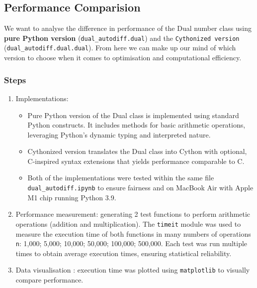 \documentclass[12.5pt]{article}
\begin{document}
\subsection{Performance Comparision}
We want to analyse the difference in performance of the Dual number class using \textbf{pure Python version} (\texttt{dual\_autodiff.dual}) and the \texttt{Cythonized version} (\texttt{dual\_autodiff.dual.dual}). From here we can make up our mind of which version to choose when it comes to optimisation and computational efficiency.

\subsubsection{Steps}
\begin{enumerate}
    \item Implementations:
    \begin{itemize}
        \item Pure Python version of the Dual class is implemented using standard Python constructs. It includes methods for basic arithmetic operations, leveraging Python's dynamic typing and interpreted nature.
        \item Cythonized version translates the Dual class into Cython with optional, C-inspired syntax extensions that yields performance comparable to C.
        \item Both of the implementations were tested within the same file \texttt{dual\_autodiff.ipynb} to ensure fairness and on MacBook Air with Apple M1 chip running Python 3.9.
    \end{itemize}


    \item Performance measurement: generating 2 test functions to perform arithmetic operations (addition and multiplication). The \texttt{timeit} module was used to measure the execution time of both functions in many numbers of operations \texttt{n}: 1,000; 5,000; 10,000; 50,000; 100,000; 500,000. Each test was run multiple times to obtain average execution times, ensuring statistical reliability.

    \item Data visualisation : execution time was plotted using \texttt{matplotlib} to visually compare performance.
\end{enumerate}
\end{document}
